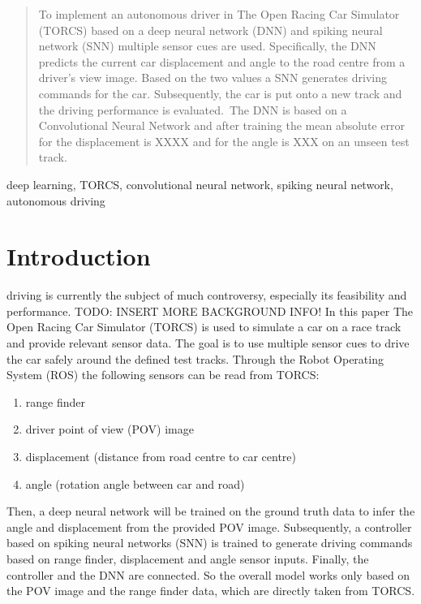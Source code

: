 \documentclass[10pt,a4paper,twoside,journal]{IEEEtran}
\begin{document}
\begin{abstract}
	To implement an autonomous driver in The Open Racing Car Simulator (TORCS)
	based on a deep neural network (DNN) and spiking neural network (SNN) multiple
	sensor cues are used. Specifically, the DNN predicts the current car displacement
	and angle to the road centre from a driver's view image. Based on the two values
	a SNN generates driving commands for the car. Subsequently, the car is put onto a 
	new track and the driving performance is evaluated.\
	The DNN is based on a Convolutional Neural Network and after training the mean 
	absolute error for the displacement is XXXX and for the angle is XXX on an
	unseen test track.
\end{abstract}

\begin{IEEEkeywords}
	deep learning, TORCS, convolutional neural network, spiking neural network, autonomous driving
\end{IEEEkeywords}

%
%
\section{Introduction}
\label{sc:intro}

 driving is currently the subject of much controversy, especially
its feasibility and performance. TODO: INSERT MORE BACKGROUND INFO! 
In this paper The Open Racing Car Simulator (TORCS) is used
to simulate a car on a race track and provide relevant sensor data. The goal is to use multiple sensor cues to drive the car safely around the defined test tracks. Through the Robot Operating System (ROS) the following sensors can be read from TORCS: 
\begin{enumerate}
	\item range finder
	\item driver point of view (POV) image
	\item displacement (distance from road centre to car centre)
	\item angle (rotation angle between car and road)
\end{enumerate}
Then, a deep neural network will be trained on the ground truth data to infer the angle and displacement from the provided POV image. Subsequently, a controller based on spiking neural networks (SNN) is trained to generate driving commands based on range finder, displacement and angle sensor inputs. Finally, the controller and the DNN are connected. So the overall model works only based on the POV image and the range finder data, which are directly taken from TORCS.
\end{document}
